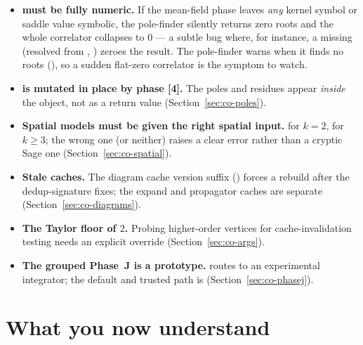 \begin{itemize}
  \item \textbf{ must be fully numeric.} If the mean-field phase
        leaves \emph{any} kernel symbol or saddle value symbolic, the pole-finder
        silently returns zero roots and the whole correlator collapses to $0$ ---
        a subtle bug where, for instance, a missing  (resolved from
        , ) zeroes the
        result. The pole-finder warns when it finds no roots
        (), so a sudden flat-zero correlator is
        the symptom to watch.
  \item \textbf{ is mutated in place by phase [4].} The poles and
        residues appear \emph{inside} the  object, not as a return
        value (Section~\ref{sec:co-poles}).
  \item \textbf{Spatial models must be given the right spatial input.}
         for $k=2$,  for $k\ge3$; the
        wrong one (or neither) raises a clear error rather than a cryptic Sage one
        (Section~\ref{sec:co-spatial}).
  \item \textbf{Stale caches.} The diagram cache version suffix
        () forces a rebuild after the dedup-signature fixes;
        the expand and propagator caches are separate
        (Section~\ref{sec:co-diagrams}).
  \item \textbf{The Taylor floor of $2$.} Probing higher-order vertices for
        cache-invalidation testing needs an explicit  override
        (Section~\ref{sec:co-args}).
  \item \textbf{The grouped Phase~J is a prototype.}
         routes to an experimental integrator;
        the default and trusted path is 
        (Section~\ref{sec:co-phasej}).
\end{itemize}

\section{What you now understand}\label{sec:co-summary}


